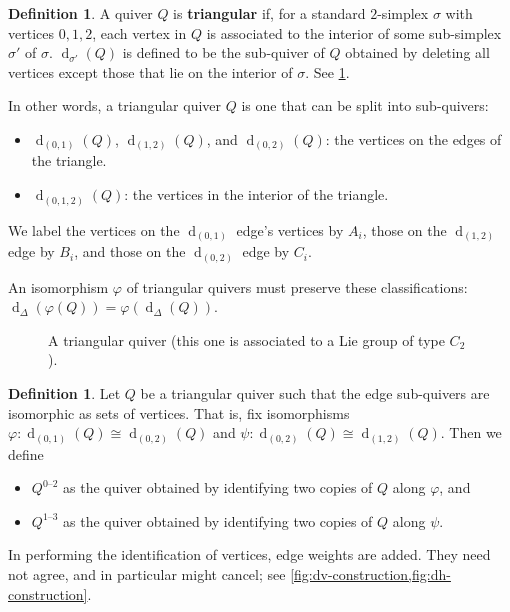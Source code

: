 \documentclass{amsart}
\theoremstyle{plain}
\theoremstyle{definition}
\newtheorem{definition}[theorem]{Definition}
\theoremstyle{remark}
\newcommand{\Qdv}{Q^{0\text{--}2}}
\newcommand{\Qdh}{Q^{1\text{--}3}}
\newcommand{\defined}[1]{\textbf{#1}}
\DeclareMathOperator{\facemap}{d}
\begin{document}
  \begin{definition}
    \label{def:triangular-quiver}
    A quiver $Q$ is \defined{triangular} if, for a standard $2$-simplex
    $\sigma$ with vertices $0, 1, 2$, each vertex in $Q$ is associated
    to the interior of some sub-simplex $\sigma'$ of $\sigma$.
    $\facemap_{\sigma'}(Q)$ is defined to be the sub-quiver of $Q$
    obtained by deleting all vertices except those that lie on the
    interior of $\sigma$. See \cref{fig:visually-triangular}.

    In other words, a triangular quiver $Q$ is one that can be split
    into sub-quivers:
    \begin{itemize}
    \item
      $\facemap_{(0,1)}(Q)$, $\facemap_{(1,2)}(Q)$, and
      $\facemap_{(0,2)}(Q)$: the vertices on the edges of the triangle.
    \item
      $\facemap_{(0,1,2)}(Q)$: the vertices in the interior of the
      triangle.
    \end{itemize}

    We label the vertices on the $\facemap_{(0,1)}$ edge's vertices by
    $A_i$, those on the $\facemap_{(1,2)}$ edge by $B_i$, and those on
    the $\facemap_{(0,2)}$ edge by $C_i$.

    An isomorphism $\varphi$ of triangular quivers must preserve these
    classifications: $\facemap_{\Delta}(\varphi(Q)) =
    \varphi(\facemap_{\Delta}(Q))$.
  \end{definition}

  \begin{figure}[h]
    \centering
    

    \caption{A triangular quiver (this one is associated to a Lie group
      of type $C_2$).
      \label{fig:visually-triangular}
    }
  \end{figure}

  \begin{definition}
    \label{def:dv-dh-construction}
    Let $Q$ be a triangular quiver such that the edge sub-quivers are
    isomorphic as sets of vertices. That is, fix isomorphisms $\varphi:
    \facemap_{(0,1)}(Q) \cong \facemap_{(0,2)}(Q)$ and $\psi :
    \facemap_{(0,2)}(Q) \cong \facemap_{(1,2)}(Q)$. Then we define
    \begin{itemize}
    \item
      $\Qdv$ as the quiver obtained by identifying two copies of $Q$
      along $\varphi$, and
    \item
      $\Qdh$ as the quiver obtained by identifying two copies of $Q$
      along $\psi$.
    \end{itemize}
    In performing the identification of vertices, edge weights are
    added. They need not agree, and in particular might cancel; see
    \cref{fig:dv-construction,fig:dh-construction}.
  \end{definition}
\end{document}
